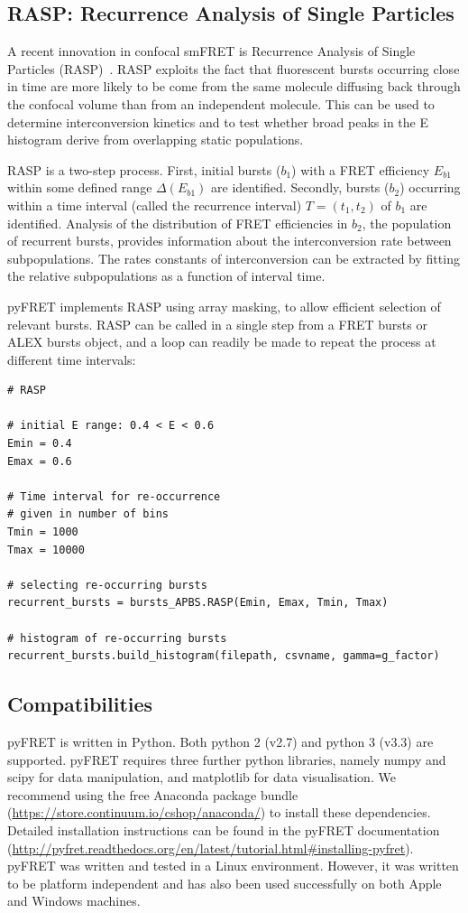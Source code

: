 \documentclass[10pt]{article}
\begin{document}
\subsection*{RASP: Recurrence Analysis of Single Particles}
A recent innovation in confocal smFRET is Recurrence Analysis of Single Particles (RASP)~\cite{hoffmann11}. RASP exploits the fact that fluorescent bursts occurring close in time are more likely to be come from the same molecule diffusing back through the confocal volume than from an independent molecule. This can be used to determine interconversion kinetics and to test whether broad peaks in the E histogram derive from overlapping static populations.

RASP is a two-step process. First, initial bursts ($b_1$) with a FRET efficiency $E_{b1}$ within some defined range $\Delta(E_{b1})$ are identified. Secondly, bursts ($b_2$) occurring within a time interval (called the recurrence interval) $T = (t_1, t_2)$ of $b_1$ are identified. Analysis of the distribution of FRET efficiencies in $b_2$, the population of recurrent bursts, provides information about the interconversion rate between subpopulations. The rates constants of interconversion can be extracted by fitting the relative subpopulations as a function of interval time.

pyFRET implements RASP using array masking, to allow efficient selection of relevant bursts. RASP can be called in a single step from a FRET bursts or ALEX bursts object, and a loop can readily be made to repeat the process at different time intervals:

\begin{lstlisting}
# RASP

# initial E range: 0.4 < E < 0.6
Emin = 0.4
Emax = 0.6

# Time interval for re-occurrence
# given in number of bins
Tmin = 1000
Tmax = 10000

# selecting re-occurring bursts
recurrent_bursts = bursts_APBS.RASP(Emin, Emax, Tmin, Tmax)

# histogram of re-occurring bursts
recurrent_bursts.build_histogram(filepath, csvname, gamma=g_factor)
\end{lstlisting} 

\subsection*{Compatibilities}
pyFRET is written in Python. Both python 2 (v2.7) and python 3 (v3.3) are supported. pyFRET requires three further python libraries,  namely numpy and scipy for data manipulation, and matplotlib for data visualisation. We recommend using the free Anaconda package bundle (\url{https://store.continuum.io/cshop/anaconda/}) to install these dependencies. Detailed installation instructions can be found in the pyFRET documentation (\url{http://pyfret.readthedocs.org/en/latest/tutorial.html#installing-pyfret}). pyFRET was written and tested in a Linux environment. However, it was written to be platform independent and has also been used successfully on both Apple and Windows machines.
\end{document}
